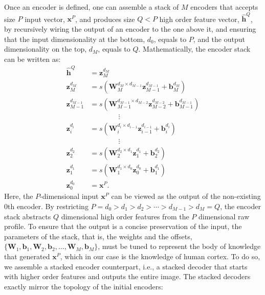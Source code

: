 \documentclass[11pt]{article}
\newcommand{\vecEC}[1]{\boldsymbol{#1}}
\newcommand{\WEC}{\vecEC{W}}                   %
\newcommand{\WEI}[3]{\WEC_{#1}^{d_{#2} \times d_{#3}}} %
\newcommand{\bEC}{\vecEC{b}}    %
\newcommand{\bEI}[2]{\bEC_{#1}^{d_{#2}}} %
\newcommand{\xEC}{\vecEC{x}}
\newcommand{\hHT}{\boldsymbol{\hat{h}}}
\newcommand{\zEC}{\vecEC{z}}
\newcommand{\zEI}[2]{\zEC_{#1}^{d_{#2}}}
\begin{document}
Once an encoder is defined, one can assemble a stack of $M$ encoders that accepts size $P$ input vector, $\xEC^P$, and produces size $Q<P$ high order feature vector, $\hHT^Q$, by recursively wiring the output of an encoder to the one above it, and ensuring that the input dimensionality at the bottom, $d_0$, equals to $P$, and the output dimensionality on the top, $d_M$, equals to $Q$. Mathematically, the encoder stack can be written as:
\begin{equation} \label{eq:SE}
  \begin{split}
    \hHT^Q &= \zEI{M}{M} \\
    \zEI{M  }{M  } &= s(\WEI{M  }{M  }{M-1} \zEI{M-1}{M-1} + \bEI{M  }{M  }) \\
    \zEI{M-1}{M-1} &= s(\WEI{M-1}{M-1}{M-2} \zEI{M-2}{M-2} + \bEI{M-1}{M-1}) \\
    & \quad \quad \quad \quad \vdots \\
    \zEI{i  }{i  } &= s(\WEI{i  }{i  }{i-1} \zEI{i-1}{i-1} + \bEI{i  }{i  }) \\
    & \quad \quad \quad \quad \vdots \\
    \zEI{2  }{2  } &= s(\WEI{2  }{2  }{1  } \zEI{1  }{1  } + \bEI{2  }{2  }) \\
    \zEI{1  }{1  } &= s(\WEI{1  }{1  }{0  } \zEI{0  }{0  } + \bEI{1  }{1  }) \\
    \zEI{0  }{0  } &= \xEC^P.
  \end{split}
\end{equation}
Here, the $P$-dimensional input $\xEC^P$ can be viewed as the output of the non-existing $0$th encoder. By restricting $P = d_0 > d_1 > d_2 > \cdots > d_{M-1} > d_M = Q$, the encoder stack abstracts $Q$ dimensional high order features from the $P$ dimensional raw profile. To ensure that the output is a concise preservation of the input, the parameters of the stack, that is, the weights and the offsets, $\{\WEC_1, \bEC_1, \WEC_2, \bEC_2, \dots, \WEC_M, \bEC_M\}$, must be tuned to represent the body of knowledge that generated $\xEC^P$, which in our case is the knowledge of human cortex. To do so, we assemble a stacked encoder counterpart, i.e., a stacked decoder that starts with higher order features and outputs the entire image. The stacked decoders exactly mirror the topology of the initial encoders:
\end{document}
